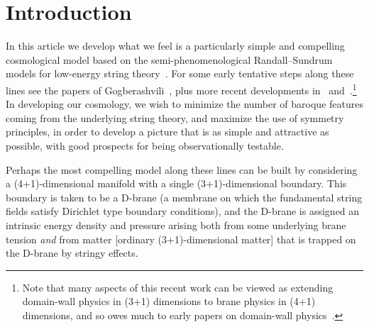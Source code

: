 \documentclass[a4paper,12pt]{article}
\begin{document}
\section{Introduction}
\label{S:intro}


In this article we develop what we feel is a particularly simple and
compelling cosmological model based on the semi-phenomenological
Randall--Sundrum models for low-energy string theory~\cite{RS1,RS2}.
For some early tentative steps along these lines see the papers of
Gogberashvili~\cite{Gogberashvili1}, plus more recent developments
in~\cite{Gogberashvili2} and~\cite{RS-cosmology}.\footnote{
Note that many aspects of this recent work can be viewed as extending
domain-wall physics in (3+1) dimensions to brane physics in (4+1)
dimensions, and so owes much to early papers on domain-wall
physics~\cite{Domain-wall}.}
In developing our cosmology, we wish to minimize the number of baroque
features coming from the underlying string theory, and maximize the
use of symmetry principles, in order to develop a picture that is as
simple and attractive as possible, with good prospects for being
observationally testable.

Perhaps the most compelling model along these lines can be built by
considering a (4+1)-dimensional manifold with a single
(3+1)-dimensional boundary. This boundary is taken to be a D-brane (a
membrane on which the fundamental string fields satisfy Dirichlet type
boundary conditions), and the D-brane is assigned an intrinsic energy
density and pressure arising both from some underlying brane tension
{\em and\/} from matter [ordinary (3+1)-dimensional matter] that is
trapped on the D-brane by stringy effects.
\end{document}
